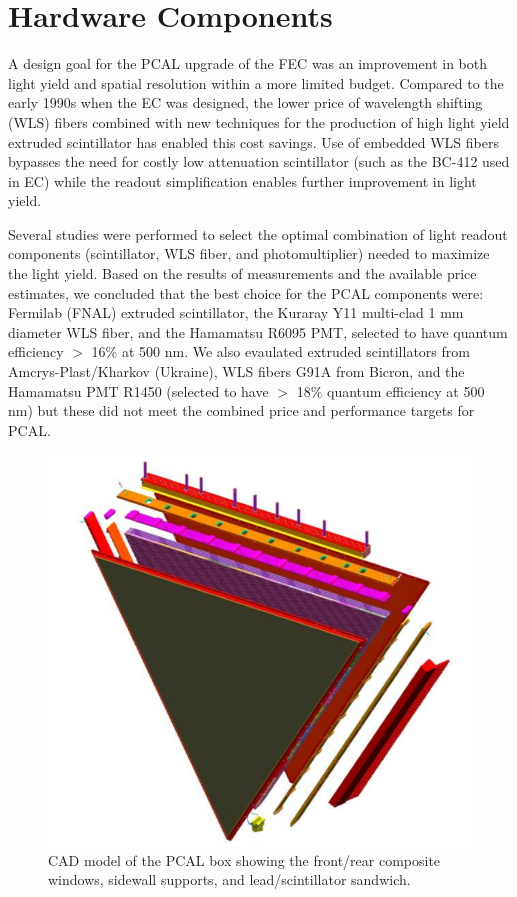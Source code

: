 \section{Hardware Components} \label{HW}

A design goal for the PCAL upgrade of the FEC was an improvement in both light yield and spatial resolution within a more limited budget.  Compared to the early 1990s when the EC was designed, the lower price of wavelength shifting (WLS) fibers combined with new techniques for the production of high light yield extruded scintillator has enabled this cost savings.  Use of embedded WLS fibers bypasses the need for costly low attenuation scintillator (such as the BC-412 used in EC) while the readout simplification enables further improvement in light yield.

Several studies were performed \cite{2007002,2007007,2009018} to select the optimal combination of light readout components (scintillator, WLS fiber, and photomultiplier) needed to maximize the light yield.  Based on the results of measurements and the available price estimates, we concluded that the best choice for the PCAL components were: Fermilab (FNAL) extruded scintillator, the Kuraray Y11 multi-clad 1 mm diameter WLS fiber, and the Hamamatsu R6095 PMT, selected to have quantum efficiency $>$ 16$\%$ at 500 nm.  We also evaulated extruded scintillators from Amcrys-Plast/Kharkov (Ukraine), WLS fibers G91A from Bicron, and the Hamamatsu PMT R1450 (selected to have $>$ 18$\%$ quantum efficiency at 500 nm) but these did not meet the combined price and performance targets for PCAL. 

\begin{figure}[hbt]
\centering
\includegraphics[width=0.95\columnwidth,keepaspectratio]{img/S4_0.png}
\caption{CAD model of the PCAL box showing the front/rear composite windows, sidewall supports, and lead/scintillator sandwich.}
\label{fig:S4_0}
\end{figure}


